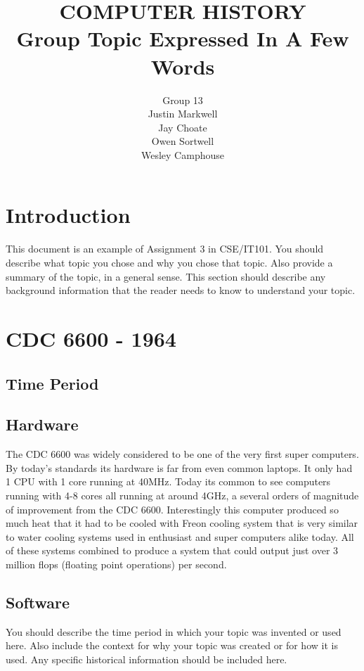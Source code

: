 \documentclass[letterpaper, 10 pt, conference]{IEEEconf}
\title{\LARGE \bf
COMPUTER HISTORY\\
\large Group Topic Expressed In A Few Words
}
\author{Group 13\\
\small Justin Markwell\\
\small Jay Choate\\
\small Owen Sortwell\\
\small Wesley Camphouse\\
}
\begin{document}
\maketitle
\thispagestyle{empty}
\pagestyle{empty}


\section{Introduction}

This document is an example of Assignment 3 in CSE/IT101.
You should describe what topic you chose and
why you chose that topic. Also provide a summary of the
topic, in a general sense. This section should describe any
background information that the reader needs to know to
understand your topic.

\section{CDC 6600 - 1964}
\subsection{Time Period}
\subsection{Hardware}
The CDC 6600 was widely considered to be one of the very first super computers. By today's standards its hardware is far from even common laptops. It only had 1 CPU with 1 core running at 40MHz. Today its common to see computers running with 4-8 cores all running at around 4GHz, a several orders of magnitude of improvement from the CDC 6600. Interestingly this computer produced so much heat that it had to be cooled with Freon cooling system that is very similar to water cooling systems used in enthusiast and super computers alike today. All of these systems combined to produce a system that could output just over 3 million flops (floating point operations) per second.   
\subsection{Software}

You should describe the time period in which your topic was
invented or used here. Also include the context for why your
topic was created or for how it is used. Any specific historical
information should be included here.
\end{document}

